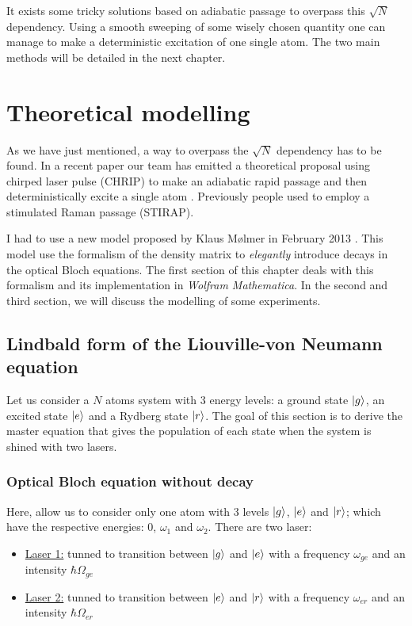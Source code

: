 \documentclass[twoside, open=right
]{scrreprt}
\newcommand{\ff}{\ensuremath{\ket{g}}\xspace}
\newcommand{\ee}{\ensuremath{\ket{e}}\xspace}
\newcommand{\rr}{\ensuremath{\ket{r}}\xspace}
\newcommand{\om}{\omega}
\newcommand{\Om}{\Omega}
\begin{document}
\par It exists some tricky solutions based on adiabatic passage to overpass this $\sqrt{N}$ dependency. Using a smooth sweeping of some wisely chosen quantity one can manage to make a deterministic excitation of one single atom. The two main methods will be detailed in the next chapter.


\chapter{Theoretical modelling}

\par As we have just mentioned, a way to overpass the $\sqrt{N}$ dependency has to be found. In a recent paper our team has emitted a theoretical proposal using chirped laser pulse (CHRIP) to make an adiabatic rapid passage and then deterministically excite a single atom \cite{Ilya}. Previously people used to employ a stimulated Raman passage (STIRAP).

\par I had to use a new model proposed by Klaus Mølmer in February 2013 \cite{Molmer}. This model use the formalism of the density matrix to \emph{elegantly} introduce decays in the optical Bloch equations. The first section of this chapter deals with this formalism and its implementation in \emph{Wolfram Mathematica}. In the second and third section, we will discuss the modelling of some experiments. 

\section[Liouville-von Neumann equation]{Lindbald form of the Liouville-von Neumann equation}

\par Let us consider a $N$ atoms system with 3 energy levels: a ground state \ff, an excited state \ee and a Rydberg state \rr. The goal of this section is to derive the master equation that gives the population of each state when the system is shined with two lasers.

\subsection{Optical Bloch equation without decay}

\par Here, allow us to consider only one atom with 3 levels \ff, \ee and \rr; which have the respective energies: $0$, $\om_1$ and $\om_2$. There are two laser:
\begin{itemize}
  \item \underline{Laser 1:} tunned to transition between \ff and \ee with a frequency $\om_{ge}$ and an intensity $\hbar \Om_{ge}$
  \item \underline{Laser 2:} tunned to transition between \ee and \rr with a frequency $\om_{er}$ and an intensity $\hbar \Om_{er}$
\end{itemize}
\end{document}
